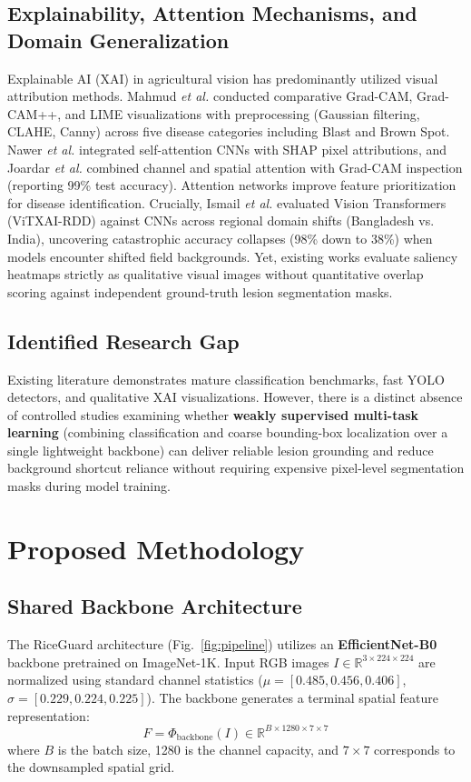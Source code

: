\documentclass[conference]{IEEEtran}
\begin{document}
\subsection{Explainability, Attention Mechanisms, and Domain Generalization}
Explainable AI (XAI) in agricultural vision has predominantly utilized visual attribution methods. Mahmud \textit{et al.} \cite{ref4} conducted comparative Grad-CAM, Grad-CAM++, and LIME visualizations with preprocessing (Gaussian filtering, CLAHE, Canny) across five disease categories including Blast and Brown Spot. Nawer \textit{et al.} \cite{ref5} integrated self-attention CNNs with SHAP pixel attributions, and Joardar \textit{et al.} \cite{ref7} combined channel and spatial attention with Grad-CAM inspection (reporting 99\% test accuracy). Attention networks \cite{ref20} improve feature prioritization for disease identification. Crucially, Ismail \textit{et al.} \cite{ref6} evaluated Vision Transformers (ViTXAI-RDD) against CNNs across regional domain shifts (Bangladesh vs. India), uncovering catastrophic accuracy collapses (98\% down to 38\%) when models encounter shifted field backgrounds. Yet, existing works evaluate saliency heatmaps strictly as qualitative visual images without quantitative overlap scoring against independent ground-truth lesion segmentation masks.

\subsection{Identified Research Gap}
Existing literature demonstrates mature classification benchmarks, fast YOLO detectors, and qualitative XAI visualizations. However, there is a distinct absence of controlled studies examining whether \textbf{weakly supervised multi-task learning} (combining classification and coarse bounding-box localization over a single lightweight backbone) can deliver reliable lesion grounding and reduce background shortcut reliance without requiring expensive pixel-level segmentation masks during model training.

\section{Proposed Methodology}
\label{sec:methodology}

\subsection{Shared Backbone Architecture}
The RiceGuard architecture (Fig.~\ref{fig:pipeline}) utilizes an \textbf{EfficientNet-B0} backbone pretrained on ImageNet-1K. Input RGB images $I \in \mathbb{R}^{3 \times 224 \times 224}$ are normalized using standard channel statistics ($\mu = [0.485, 0.456, 0.406]$, $\sigma = [0.229, 0.224, 0.225]$). The backbone generates a terminal spatial feature representation:
\begin{equation}
F = \Phi_{\text{backbone}}(I) \in \mathbb{R}^{B \times 1280 \times 7 \times 7}
\end{equation}
where $B$ is the batch size, 1280 is the channel capacity, and $7 \times 7$ corresponds to the downsampled spatial grid.
\end{document}
